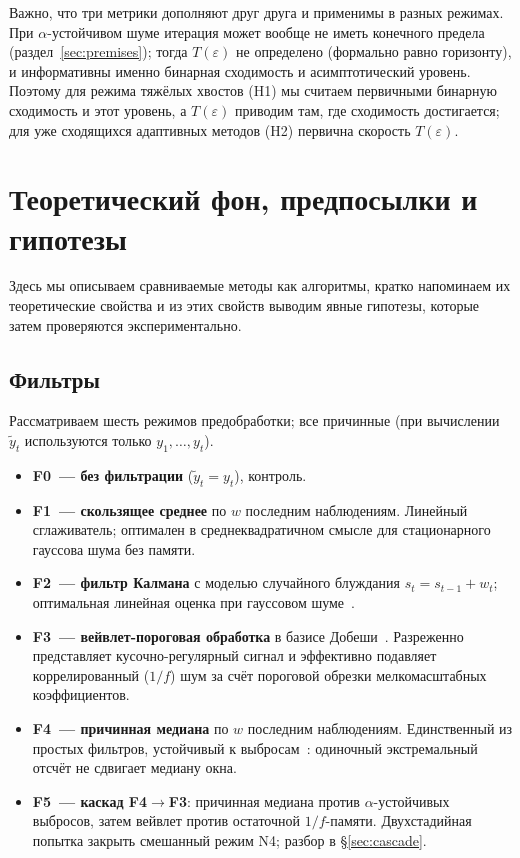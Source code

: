 \documentclass[conference]{IEEEtran}
\begin{document}
Важно, что три метрики дополняют друг друга и применимы в разных
режимах. При $\alpha$-устойчивом шуме итерация может вообще не иметь
конечного предела (раздел~\ref{sec:premises}); тогда $T(\varepsilon)$ не
определено (формально равно горизонту), и информативны именно бинарная
сходимость и асимптотический уровень. Поэтому для режима тяжёлых хвостов
(H1) мы считаем первичными бинарную сходимость и этот уровень,
а $T(\varepsilon)$
приводим там, где сходимость достигается; для уже сходящихся адаптивных
методов (H2) первична скорость $T(\varepsilon)$.

\section{Теоретический фон, предпосылки и гипотезы}
\label{sec:background}

Здесь мы описываем сравниваемые методы как алгоритмы, кратко напоминаем их
теоретические свойства и из этих свойств выводим явные гипотезы, которые
затем проверяются экспериментально.

\subsection{Фильтры}
\label{sec:filters}

Рассматриваем шесть режимов предобработки; все причинные (при вычислении
$\tilde{y}_t$ используются только $y_1,\dots,y_t$).

\begin{itemize}
  \item \textbf{F0~--- без фильтрации} ($\tilde{y}_t = y_t$), контроль.
  \item \textbf{F1~--- скользящее среднее} по $w$ последним наблюдениям.
        Линейный сглаживатель; оптимален в среднеквадратичном смысле для
        стационарного гауссова шума без памяти.
  \item \textbf{F2~--- фильтр Калмана} с моделью случайного блуждания
        $s_t = s_{t-1}+w_t$; оптимальная линейная оценка при гауссовом
        шуме~\cite{kalman1960}.
  \item \textbf{F3~--- вейвлет-пороговая обработка} в базисе
        Добеши~\cite{donoho1994wavelets,daubechies1992wavelets}.
        Разреженно представляет кусочно-регулярный сигнал и эффективно
        подавляет коррелированный ($1/f$) шум за счёт пороговой обрезки
        мелкомасштабных коэффициентов.
  \item \textbf{F4~--- причинная медиана} по $w$ последним наблюдениям.
        Единственный из простых фильтров, устойчивый к
        выбросам~\cite{yin1996median}: одиночный экстремальный отсчёт не
        сдвигает медиану окна.
  \item \textbf{F5~--- каскад F4$\to$F3}: причинная медиана против
        $\alpha$-устойчивых выбросов, затем вейвлет против остаточной
        $1/f$-памяти. Двухстадийная попытка закрыть смешанный режим N4;
        разбор в §\ref{sec:cascade}.
\end{itemize}
\end{document}
